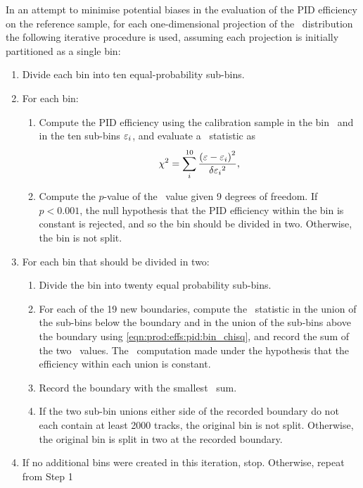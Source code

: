 In an attempt to minimise potential biases in the evaluation of the \ac{PID}
efficiency on the reference sample, for each one-dimensional projection of the
\ptotetanspd\ distribution the following iterative procedure is used, assuming
each projection is initially partitioned as a single bin:
\begin{enumerate}
  \item Divide each bin into ten equal-probability sub-bins.
  \item For each bin:
    \begin{enumerate}
      \item Compute the \ac{PID} efficiency using the calibration sample in the
        bin \eff\ and in the ten sub-bins $\varepsilon_{i}$, and evaluate a \chisq\
        statistic as
        \begin{equation}
          \chi^2 = \sum_{i}^{10} \frac{{(\varepsilon - \varepsilon_{i})}^{2}}{\delta{\ensuremath{\varepsilon}_{i}}^{2}},
          \label{eqn:prod:effs:pid:bin_chisq}
        \end{equation}
      \item Compute the $p$-value of the \chisq\ value given 9 degrees of
        freedom. If $p < 0.001$, the null hypothesis that the \ac{PID}
        efficiency within the bin is constant is rejected, and so the bin
        should be divided in two. Otherwise, the bin is not split.
    \end{enumerate}
  \item For each bin that should be divided in two:
    \begin{enumerate}
      \item Divide the bin into twenty equal probability sub-bins.
      \item For each of the 19 new boundaries, compute the \chisq\ statistic in
        the union of the sub-bins below the boundary and in the union of the
        sub-bins above the boundary using \cref{eqn:prod:effs:pid:bin_chisq},
        and record the sum of the two \chisq\ values. The \chisq\ computation 
        made under the hypothesis that the efficiency within each union is 
        constant.
      \item Record the boundary with the smallest \chisq\ sum.
      \item If the two sub-bin unions either side of the recorded boundary do
        not each contain at least 2000 tracks, the original bin is not split.
        Otherwise, the original bin is split in two at the recorded boundary.
    \end{enumerate}
  \item If no additional bins were created in this iteration, stop.  Otherwise,
    repeat from Step 1
\end{enumerate}
